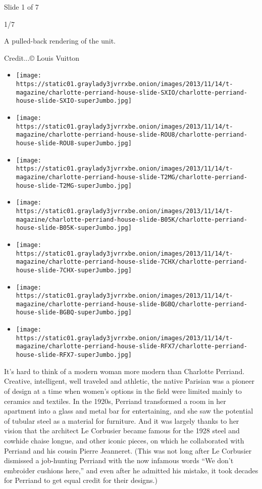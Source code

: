 Slide 1 of 7

1/7

A pulled-back rendering of the unit.

Credit...© Louis Vuitton

\begin{itemize}
\item
  \texttt{[image: https://static01.graylady3jvrrxbe.onion/images/2013/11/14/t-magazine/charlotte-perriand-house-slide-SXIO/charlotte-perriand-house-slide-SXIO-superJumbo.jpg]}
\item
  \texttt{[image: https://static01.graylady3jvrrxbe.onion/images/2013/11/14/t-magazine/charlotte-perriand-house-slide-ROU8/charlotte-perriand-house-slide-ROU8-superJumbo.jpg]}
\item
  \texttt{[image: https://static01.graylady3jvrrxbe.onion/images/2013/11/14/t-magazine/charlotte-perriand-house-slide-T2MG/charlotte-perriand-house-slide-T2MG-superJumbo.jpg]}
\item
  \texttt{[image: https://static01.graylady3jvrrxbe.onion/images/2013/11/14/t-magazine/charlotte-perriand-house-slide-B05K/charlotte-perriand-house-slide-B05K-superJumbo.jpg]}
\item
  \texttt{[image: https://static01.graylady3jvrrxbe.onion/images/2013/11/14/t-magazine/charlotte-perriand-house-slide-7CHX/charlotte-perriand-house-slide-7CHX-superJumbo.jpg]}
\item
  \texttt{[image: https://static01.graylady3jvrrxbe.onion/images/2013/11/14/t-magazine/charlotte-perriand-house-slide-BGBQ/charlotte-perriand-house-slide-BGBQ-superJumbo.jpg]}
\item
  \texttt{[image: https://static01.graylady3jvrrxbe.onion/images/2013/11/14/t-magazine/charlotte-perriand-house-slide-RFX7/charlotte-perriand-house-slide-RFX7-superJumbo.jpg]}
\end{itemize}

It's hard to think of a modern woman more modern than Charlotte
Perriand. Creative, intelligent, well traveled and athletic, the native
Parisian was a pioneer of design at a time when women's options in the
field were limited mainly to ceramics and textiles. In the 1920s,
Perriand transformed a room in her apartment into a glass and metal bar
for entertaining, and she saw the potential of tubular steel as a
material for furniture. And it was largely thanks to her vision that the
architect Le Corbusier became famous for the 1928 steel and cowhide
chaise longue, and other iconic pieces, on which he collaborated with
Perriand and his cousin Pierre Jeanneret. (This was not long after Le
Corbusier dismissed a job-hunting Perriand with the now infamous words
``We don't embroider cushions here,'' and even after he admitted his
mistake, it took decades for Perriand to get equal credit for their
designs.)

